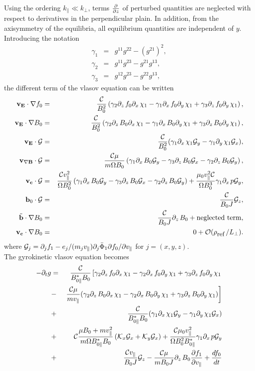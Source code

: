 Using the ordering $k_\parallel \ll k_\perp$, terms $\frac{\partial}{\partial z}$ of perturbed quantities are neglected with respect to derivatives in the perpendicular plain. In addition, from the axisymmetry of the equilibria, all equilibrium quantities are independent of $y$.
Introducing the notation 
\begin{eqnarray*}
\gamma _1 &=& g^{11} g^{22}-(g^{21})^2 ,\\
\gamma _2 &=& g^{11} g^{23}-g^{21}g^{13} ,\\
\gamma _3 &=& g^{12} g^{23}-g^{22}g^{13},
\end{eqnarray*}
the different term of the vlasov equation can be written
\begin{eqnarray*}
\vE \cdot \nabla f_0 &=& \frac{\C}{B_0^2} \left ( \gamma _2 \dz f_0 \dx \chi _1
-\gamma _1 \dx f_0 \dy \chi _1 
+ \gamma _3 \dz f_0 \dy \chi _1 \right ) ,\\
%
\vE \cdot \nabla B_0 &=& \frac{\C}{B_0^2} \left ( \gamma _2 \dz B_0 \dx \chi _1
-\gamma _1 \dx B_0 \dy \chi _1 
+ \gamma _3 \dz B_0 \dy \chi _1 \right ) ,\\
%
\vE \cdot \G &=& \frac{\C}{B_0 ^2}(\gamma _1 \dx \chi_1 \G _y - \gamma _1 \dy \chi _1 \G _x),\\
%
\vgB \cdot \G &=& \frac{\C \mu}{m \Omega B_0} \left (  \gamma_1 \dx B_0 \G _y 
- \gamma _3 \dz B_0 \G _x - \gamma_2 \dz B_0 \G _y \right ) ,\\
%
\vc \cdot \G &=& \frac{\C \vpar ^2}{\Omega B_0^2}\left ( \gamma_1 \dx B_0 \G _y 
- \gamma _3 \dz B_0 \G _x - \gamma_2 \dz B_0 \G _y \right )
+ \frac{\mu_0 \vpar ^2 \C}{\Omega B_0^3} \gamma _1 \dx p \G _y  ,\\
%
\b _0 \cdot \G &=& \frac{\C}{B_0 J}\G _z, \\
%
\tilde{\b} \cdot \nabla B_0 &=& \frac{\C}{B_0 J} \dz B_0 + \mbox{neglected term},\\
%
\vc \cdot \nabla B_0 &=& 0 + \mathcal{O}(\rhor/L_\perp).
\end{eqnarray*}
where $\mathbf{\mathcal{G}}_j=\partial_j f_1-e_j /(m_j v_\parallel)\partial _j \bar{\Phi}_1 \partial f_0/\partial v_\parallel$ for $j=(x,y,z)$.\\
The gyrokinetic vlasov equation becomes 
\begin{eqnarray*}
- \d _t g &=& \frac{\C}{\Bs B_0} \left [  \gamma _2 \dz f_0 \dx \chi _1
-\gamma _2 \dx f_0 \dy \chi _1 
+ \gamma _3 \dz f_0 \dy \chi _1  \right . \\
&-& \left . \frac{\C\mu}{m \vpar} (\gamma _2 \dz B_0 \dx \chi _1
-\gamma _2 \dx B_0 \dy \chi _1 
+ \gamma _3 \dz B_0 \dy \chi _1)  \right ] \\
%
&+& \frac{\C}{\Bs B_0}  (\gamma _1 \dx \chi_1 \G _y - \gamma _1 \dy \chi _1 \G _x) \\
%
&+& \C\frac{\mu B_0+m\vpar ^2}{m \Omega \Bs B_0 }\left (\Kx \G _x + \Ky \G _x\right) + \frac{\C \mu_0 \vpar ^2 }{\Omega B_0^2 \Bs}  \gamma _1  \dx p \G _y\\
%
&+& \frac{\C\vpar}{B_0 J}\G _z - \frac{\C\mu}{m B_0 J} \dz B_0 \frac{\d f_1}{\d \vpar} + \frac{df_0}{dt}
\end{eqnarray*}
